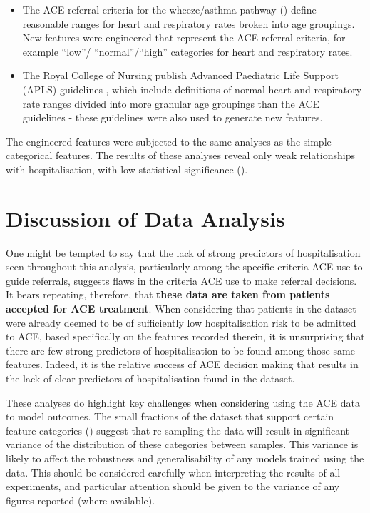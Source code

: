 \begin{itemize}
    \item The ACE referral criteria for the wheeze/asthma pathway () define reasonable ranges for heart and respiratory rates broken into age groupings. New features were engineered that represent the ACE referral criteria, for example ``low''/ ``normal''/``high'' categories for heart and respiratory rates.
    \item The Royal College of Nursing  publish Advanced Paediatric Life Support (APLS) guidelines \cite{rcn_apls}, which include definitions of normal heart and respiratory rate ranges divided into more granular age groupings than the ACE guidelines - these guidelines were also used to generate new features.
\end{itemize}

The engineered features were subjected to the same analyses as the simple categorical features. The results of these analyses reveal only weak relationships with hospitalisation, with low statistical significance ().

\section{Discussion of Data Analysis}\label{sec:discussion-of-data-analysis}

One might be tempted to say that the lack of strong predictors of hospitalisation seen throughout this analysis, particularly among the specific criteria ACE use to guide referrals, suggests flaws in the criteria ACE use to make referral decisions. It bears repeating, therefore, that \textbf{these data are taken from patients accepted for ACE treatment}. When considering that patients in the dataset were already deemed to be of sufficiently low hospitalisation risk to be admitted to ACE, based specifically on the features recorded therein, it is unsurprising that there are few strong predictors of hospitalisation to be found among those same features. Indeed, it is the relative success of ACE decision making that results in the lack of clear predictors of hospitalisation found in the dataset.

These analyses do highlight key challenges when considering using the ACE data to model outcomes. The small fractions of the dataset that support certain feature categories () suggest that re-sampling the data will result in significant variance of the distribution of these categories between samples. This variance is likely to affect the robustness and generalisability of any models trained using the data. This should be considered carefully when interpreting the results of all experiments, and particular attention should be given to the variance of any figures reported (where available).

